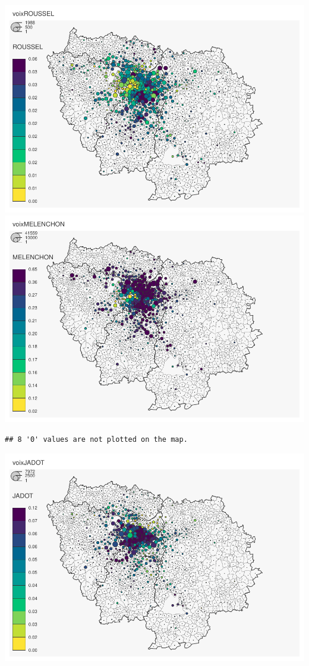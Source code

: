 \documentclass[
]{book}
\begin{document}
\includegraphics{bookdown-demo_files/figure-latex/unnamed-chunk-52-3.pdf} \includegraphics{bookdown-demo_files/figure-latex/unnamed-chunk-52-4.pdf}

\begin{verbatim}
## 8 '0' values are not plotted on the map.
\end{verbatim}

\includegraphics{bookdown-demo_files/figure-latex/unnamed-chunk-52-5.pdf}
\end{document}
